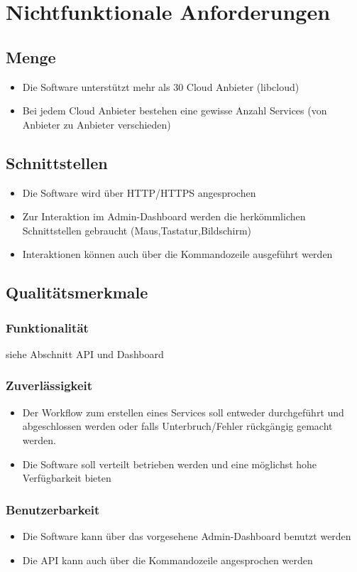 \documentclass[11pt]{scrartcl}
\begin{document}
\section{Nichtfunktionale Anforderungen}
\subsection{Menge}
\begin{itemize}
  \item Die Software unterstützt mehr als 30 Cloud Anbieter (libcloud)
  \item Bei jedem Cloud Anbieter bestehen eine gewisse Anzahl Services (von Anbieter zu Anbieter verschieden)
\end{itemize}

\subsection{Schnittstellen}
\begin{itemize}
  \item Die Software wird über HTTP/HTTPS angesprochen
  \item Zur Interaktion im Admin-Dashboard werden die herkömmlichen 
  Schnittstellen gebraucht (Maus,Tastatur,Bildschirm)
  \item Interaktionen können auch über die Kommandozeile ausgeführt werden
\end{itemize}
\subsection{Qualitätsmerkmale}
\subsubsection{Funktionalität}
siehe Abschnitt API und Dashboard
\subsubsection{Zuverlässigkeit}
\begin{itemize}
  \item Der Workflow zum erstellen eines Services soll entweder durchgeführt und 
  abgeschlossen werden oder falls Unterbruch/Fehler rückgängig gemacht 
  werden.
  \item Die Software soll verteilt betrieben werden und eine möglichst hohe 
  Verfügbarkeit bieten
\end{itemize}
\subsubsection{Benutzerbarkeit}
\begin{itemize}
  \item Die Software kann über das vorgesehene Admin-Dashboard benutzt werden
  \item Die API kann auch über die Kommandozeile angesprochen werden
\end{itemize}
\end{document}
